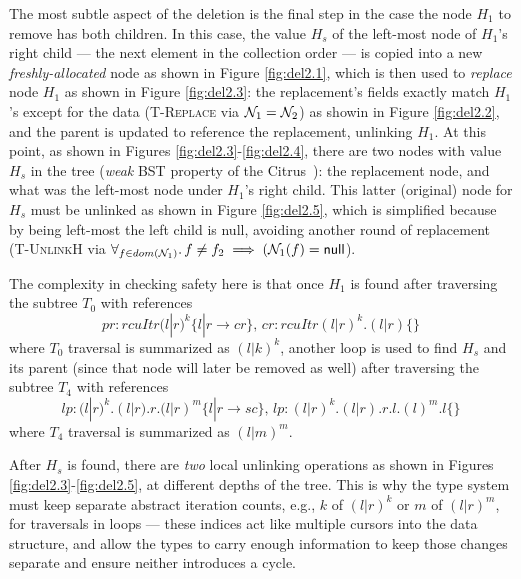 The most subtle aspect of the deletion is the final step in the case the node $H_1$ to remove has both children. In this case, the value $H_s$ of the left-most node of $H_1$'s right child --- the next element in the collection order --- is copied into a new \textit{freshly-allocated} node as shown in Figure \ref{fig:del2.1}, which is then used to \emph{replace} node $H_1$ as shown in Figure \ref{fig:del2.3}: the replacement's fields exactly match $H_1$'s except for the data (\textsc{T-Replace} via $\mathcal{N}_1 = \mathcal{N}_2$) as showin in Figure \ref{fig:del2.2}, and the parent is updated to reference the replacement, unlinking $H_1$. At this point, as shown in Figures \ref{fig:del2.3}-\ref{fig:del2.4}, there are two nodes with value $H_s$ in the tree (\textit{weak} BST property of the Citrus~\cite{Arbel:2014:CUR:2611462.2611471}): the replacement node, and what was the left-most node under $H_1$'s right child. This latter (original) node for $H_s$ must be unlinked as shown in Figure \ref{fig:del2.5}, which is simplified because by being left-most the left child is null, avoiding another round of replacement (\textsc{T-UnlinkH} via $\forall_{f\in dom(\mathcal{N}_1)} \ldotp f\neq f_2 \implies (\mathcal{N}_1(f) = \textsf{null}$).

The complexity in checking safety here is that once $H_1$ is found after traversing the subtree $T_0$ with references
\[ pr:rcuItr(l|r)^{k} \{l|r \rightarrow cr\},\, cr:rcuItr(l|r)^{k}.(l|r) \{\}\]
where $T_0$ traversal is summarized as $(l|k)^{k}$, another loop is used to find $H_s$ and its parent (since that node will later be removed as well) after traversing the subtree $T_4$ with references
\[lp:(l|r)^{k}.(l|r).r.(l|r)^{m} \{l|r \rightarrow sc\},\, lp:(l|r)^{k}.(l|r).r.l.(l)^{m}.l\{\}\]
where $T_4$ traversal is summarized as $(l|m)^{m}$.

After $H_s$ is found, there are \emph{two} local unlinking operations as shown in Figures \ref{fig:del2.3}-\ref{fig:del2.5}, at different depths of the tree.  This is why the type system must keep separate abstract iteration counts, e.g., $k$ of $(l|r)^{k}$ or $m$ of $(l|r)^{m}$, for traversals in loops --- these indices act like multiple cursors into the data structure, and allow the types to carry enough information to keep those changes separate and ensure neither introduces a cycle.

